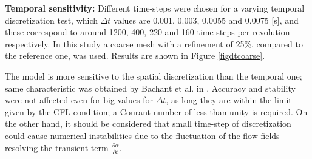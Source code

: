 \documentclass[a4paper]{jpconf}
\begin{document}
\textbf{Temporal sensitivity:} Different time-steps were chosen for a varying temporal discretization test, which $\Delta t$ values are 0.001, 0.003, 0.0055 and 0.0075 [s], and these correspond to around 1200, 400, 220 and 160 time-steps per revolution respectively. In this study a coarse mesh with a refinement of 25\%, compared to the reference one, was used. Results are shown in Figure \ref{figdtcoarse}. 

The model is more sensitive to the spatial discretization than the temporal one; same characteristic was obtained by Bachant et al. in \cite{Bachant2016-VAT-ALM}. Accuracy and stability were not affected even for big values for $\Delta t$, as long they are within the limit given by the CFL condition; a Courant number of less than unity is required. On the other hand, it should be considered that small time-step of discretization could cause numerical instabilities due to the fluctuation of the flow fields resolving the transient term $\frac{\partial \alpha}{\partial t}$.
\end{document}
